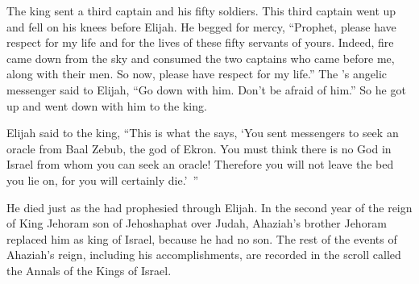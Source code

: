 {\par }{\PP {}The king
sent
a third
captain
and his fifty
soldiers. This third
captain
went
up
and fell
on
his knees
before
Elijah.
He begged
for mercy, “Prophet,
please
have respect
for my life
and for the lives
of these
fifty
servants
of yours.
Indeed,
fire
came down
from
the sky
and consumed
the two
captains
who came before me, along with their men.
So now,
please have respect
for my life.”
The
{}’s
angelic
messenger
said
to Elijah,
“Go down
with
him. Don’t
be afraid
of him.” So he got
up and went down
with
him to
the king.
\par }{\PP {}Elijah said
to
the king, “This is what the
{}
says,
‘You sent
messengers
to seek
an oracle from Baal Zebub,
the god
of Ekron.
You must think
there is no
God
in Israel
from whom
you can seek
an oracle! Therefore
you will not
leave
the bed
you lie
on, for
you will certainly
die.’ ”
\par }{\PP {}He died
just
as the
{}
had
prophesied
through Elijah.
In the second
year
of the reign
of King Jehoram
son
of Jehoshaphat
over Judah,
Ahaziah’s brother Jehoram
replaced
him as king
of Israel, because
he had no
son.
The rest
of the events
of Ahaziah’s
reign, including
his accomplishments,
are recorded
in the scroll
called the Annals
of the Kings
of Israel.

}
